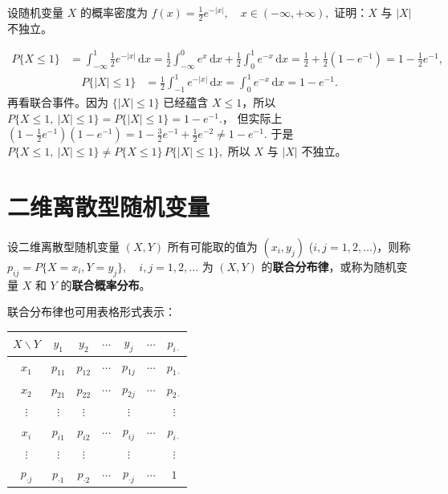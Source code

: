 \documentclass[lang=cn,11pt]{elegantbook}
\begin{document}
\begin{exercise}[证明 $X$ 与 $|X|$ 不独立] \label{exer:3-5c}
设随机变量 $X$ 的概率密度为
\(
f(x) = \frac{1}{2}e^{-|x|}, \quad x \in (-\infty, +\infty),
\)
证明：$X$ 与 $|X|$ 不独立。
\end{exercise}
\begin{solution}
\[
\begin{aligned}
P\{X\le 1\}
&=\int_{-\infty}^1 \frac{1}{2}e^{-|x|}\,\mathrm{d}x =\frac{1}{2}\int_{-\infty}^{0} e^x\,\mathrm{d}x+\frac{1}{2}\int_{0}^{1} e^{-x}\,\mathrm{d}x =\frac{1}{2}+\frac{1}{2}(1-e^{-1})
=1-\frac{1}{2}e^{-1},
\end{aligned}
\]
\[
\begin{aligned}
P\{|X|\le 1\}
&=\frac{1}{2}\int_{-1}^{1}e^{-|x|}\,\mathrm{d}x
=\int_{0}^{1}e^{-x}\,\mathrm{d}x
=1-e^{-1}.
\end{aligned}
\]
再看联合事件。因为 $\{|X|\le 1\}$ 已经蕴含 $X\le 1$，所以
\(
P\{X\le 1,\ |X|\le 1\}=P\{|X|\le 1\}=1-e^{-1}.
\)，
但实际上
\(
\left(1-\frac{1}{2}e^{-1}\right)(1-e^{-1})
=1-\frac{3}{2}e^{-1}+\frac{1}{2}e^{-2}
\neq 1-e^{-1}.
\)
于是
\(
P\{X\le 1,\ |X|\le 1\}\neq P\{X\le 1\}\,P\{|X|\le 1\},
\)
所以 $X$ 与 $|X|$ 不独立。
\end{solution}

\section{二维离散型随机变量}

\begin{definition}[联合分布律]  \label{def:joint-pm}
设二维离散型随机变量 $(X,Y)$ 所有可能取的值为 $(x_i, y_j)$ ($i,j = 1,2,\dots$)，则称
\(
p_{ij} = P\{X = x_i, Y = y_j\}, \quad i,j = 1,2,\dots
\)
为 $(X,Y)$ 的\textbf{联合分布律}，或称为随机变量 $X$ 和 $Y$ 的\textbf{联合概率分布}。
\end{definition}

联合分布律也可用表格形式表示：

\begin{center}
\begin{tabular}{c|ccccc|c}
\toprule
$X \backslash Y$ & $y_1$ & $y_2$ & $\cdots$ & $y_j$ & $\cdots$ & $p_{i\cdot}$ \\
\midrule
$x_1$ & $p_{11}$ & $p_{12}$ & $\cdots$ & $p_{1j}$ & $\cdots$ & $p_{1\cdot}$ \\
$x_2$ & $p_{21}$ & $p_{22}$ & $\cdots$ & $p_{2j}$ & $\cdots$ & $p_{2\cdot}$ \\
$\vdots$ & $\vdots$ & $\vdots$ & & $\vdots$ & & $\vdots$ \\
$x_i$ & $p_{i1}$ & $p_{i2}$ & $\cdots$ & $p_{ij}$ & $\cdots$ & $p_{i\cdot}$ \\
$\vdots$ & $\vdots$ & $\vdots$ & & $\vdots$ & & $\vdots$ \\
\midrule
$p_{\cdot j}$ & $p_{\cdot1}$ & $p_{\cdot2}$ & $\cdots$ & $p_{\cdot j}$ & $\cdots$ & $1$ \\
\bottomrule
\end{tabular}
\end{center}
\end{document}
